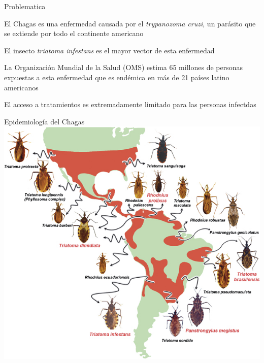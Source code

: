 \documentclass{beamer}
\begin{document}
\begin{frame}{Problematica}

			El Chagas es una enfermedad causada por el \textit{trypanozoma cruzi}, un parásito que se extiende por todo el continente americano

			\medskip  El insecto \textit{triatoma infestans} es el mayor vector de esta enfermedad

			\medskip  La Organización Mundial de la Salud (OMS) estima 65 millones de personas expuestas a esta enfermedad que es endémica en más de 21 países latino americanos

			\medskip El acceso a tratamientos es extremadamente limitado para las personas infectdas

\end{frame}


\begin{frame}{Epidemiología del Chagas}
			\includegraphics[height=.9\textheight]{slides/triatomine-map.jpg}
\end{frame}
\end{document}

